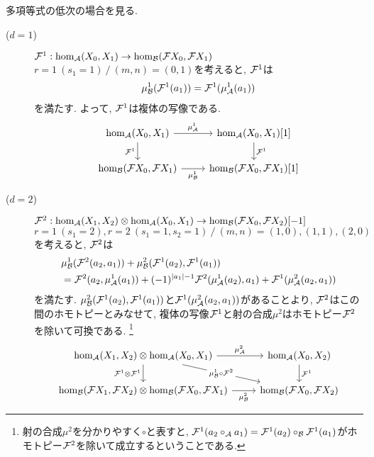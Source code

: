 \documentclass[uplatex, a4paper, 14Q, dvipdfmx]{jsarticle}
\begin{document}
\begin{remark}
  多項等式の低次の場合を見る. 
  \begin{description}
    \item[($d=1$)] $\mathcal{F}^1 : \hom_{\mathcal{A}}(X_0,X_1) \to \hom_{\mathcal{B}}(\mathcal{F} X_0,\mathcal{F} X_1)$ \\
    $r=1 ~ (s_1=1) ~/~ (m,n)=(0,1)$を考えると, $\mathcal{F}^1$は
    \begin{align*}
      \mu^1_{\mathcal{B}}(\mathcal{F}^1(a_1)) = \mathcal{F}^1(\mu^1_{\mathcal{A}}(a_1))
    \end{align*}
    を満たす. 
    よって, $\mathcal{F}^1$は複体の写像である.
    \[\begin{tikzcd}
      {\hom_\A(X_0,X_1)} & {\hom_\A(X_0,X_1)[1]} \\
      {\hom_\B(\F X_0,\F X_1)} & {\hom_\B(\F X_0,\F X_1)[1]}
      \arrow["{\mu^1_\A}", from=1-1, to=1-2]
      \arrow["{\F^1}", from=1-2, to=2-2]
      \arrow["{\F^1}"', from=1-1, to=2-1]
      \arrow["{\mu^1_\B}"', from=2-1, to=2-2]
    \end{tikzcd}\] 
    \item[($d=2$)] $\mathcal{F}^2 : \hom_{\mathcal{A}}(X_1,X_2) \otimes \hom_{\mathcal{A}}(X_0,X_1) \to \hom_{\mathcal{B}}(\mathcal{F} X_0,\mathcal{F} X_2)[-1]$ \\
    $r=1 ~ (s_1=2), r=2 ~ (s_1=1, s_2=1) ~/~ (m,n)=(1,0), (1,1), (2,0)$を考えると, $\mathcal{F}^2$は
    \begin{align*}
      &\mu^1_{\mathcal{B}}(\mathcal{F}^2(a_2,a_1)) + \mu^2_{\mathcal{B}}(\mathcal{F}^1(a_2), \mathcal{F}^1(a_1)) \\
      &= \mathcal{F}^2(a_2,\mu^1_{\mathcal{A}}(a_1)) + (-1)^{|a_1|-1} \mathcal{F}^2(\mu^1_{\mathcal{A}}(a_2),a_1) + \mathcal{F}^1(\mu^2_{\mathcal{A}}(a_2,a_1))
    \end{align*}
    を満たす. 
    $\mu^2_{\mathcal{B}}(\mathcal{F}^1(a_2), \mathcal{F}^1(a_1)) $と$\mathcal{F}^1(\mu^2_{\mathcal{A}}(a_2,a_1))$があることより, $\mathcal{F}^2$はこの間のホモトピーとみなせて, 複体の写像$\mathcal{F}^1$と射の合成$\mu^2$はホモトピー$\mathcal{F}^2$を除いて可換である.
    \footnote{
      射の合成$\mu^2$を分かりやすく$\circ$と表すと, $\mathcal{F}^1(a_2 \circ_{\mathcal{A}} a_1)=\mathcal{F}^1(a_2) \circ_{\mathcal{B}} \mathcal{F}^1(a_1)$がホモトピー$\mathcal{F}^2$を除いて成立するということである. 
    }
    \[\begin{tikzcd}
      {\hom_\A(X_1,X_2) \otimes \hom_\A(X_0,X_1)} & {\hom_\A(X_0,X_2)} \\
      {\hom_\B(\F X_1,\F X_2) \otimes \hom_\B(\F X_0,\F X_1)} & {\hom_\B(\F X_0,\F X_2)}
      \arrow["{\mu^2_\A}", from=1-1, to=1-2]
      \arrow["{\F^1}", from=1-2, to=2-2]
      \arrow["{\F^1 \otimes \F^1}"', from=1-1, to=2-1]
      \arrow["{\mu^2_\B}"', from=2-1, to=2-2]
      \arrow["{\mu^1_\B \circ \F^2}"{description}, from=1-1, to=2-2]
    \end{tikzcd}\] 
  \end{description}
\end{remark}
\end{document}
